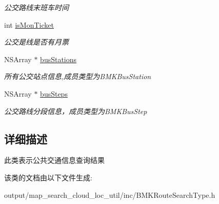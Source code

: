\begin{DoxyCompactItemize}
\begin{DoxyCompactList}\small\item\em 公交路线末班车时间 \end{DoxyCompactList}\item 
\hypertarget{interface_b_m_k_bus_line_result_a2c311dc1e3378a192ffacdb2c3654ade}{int \hyperlink{interface_b_m_k_bus_line_result_a2c311dc1e3378a192ffacdb2c3654ade}{is\+Mon\+Ticket}}\label{interface_b_m_k_bus_line_result_a2c311dc1e3378a192ffacdb2c3654ade}

\begin{DoxyCompactList}\small\item\em 公交是线是否有月票 \end{DoxyCompactList}\item 
\hypertarget{interface_b_m_k_bus_line_result_a9fe3884161bea9c3955a65eebbb00d70}{N\+S\+Array $\ast$ \hyperlink{interface_b_m_k_bus_line_result_a9fe3884161bea9c3955a65eebbb00d70}{bus\+Stations}}\label{interface_b_m_k_bus_line_result_a9fe3884161bea9c3955a65eebbb00d70}

\begin{DoxyCompactList}\small\item\em 所有公交站点信息,成员类型为\+B\+M\+K\+Bus\+Station \end{DoxyCompactList}\item 
\hypertarget{interface_b_m_k_bus_line_result_acbb640c72f6b2649ee131c95fd826407}{N\+S\+Array $\ast$ \hyperlink{interface_b_m_k_bus_line_result_acbb640c72f6b2649ee131c95fd826407}{bus\+Steps}}\label{interface_b_m_k_bus_line_result_acbb640c72f6b2649ee131c95fd826407}

\begin{DoxyCompactList}\small\item\em 公交路线分段信息，成员类型为\+B\+M\+K\+Bus\+Step \end{DoxyCompactList}\end{DoxyCompactItemize}


\subsection{详细描述}
此类表示公共交通信息查询结果 

该类的文档由以下文件生成\+:\begin{DoxyCompactItemize}
\item 
output/map\+\_\+search\+\_\+cloud\+\_\+loc\+\_\+util/inc/B\+M\+K\+Route\+Search\+Type.\+h\end{DoxyCompactItemize}
